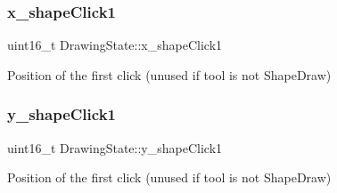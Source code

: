 \mbox{\label{group__game__state_ga2e0a42da2415d5aa408c1bb6f6f5e4c7}} 
\subsubsection{\texorpdfstring{x\+\_\+shape\+Click1}{x\_shapeClick1}}
{\footnotesize\ttfamily uint16\+\_\+t Drawing\+State\+::x\+\_\+shape\+Click1}



Position of the first click (unused if tool is not Shape\+Draw) 

\mbox{\label{group__game__state_ga9c366a1e61752594e2755c01c9c43dd6}} 
\subsubsection{\texorpdfstring{y\+\_\+shape\+Click1}{y\_shapeClick1}}
{\footnotesize\ttfamily uint16\+\_\+t Drawing\+State\+::y\+\_\+shape\+Click1}



Position of the first click (unused if tool is not Shape\+Draw) 


